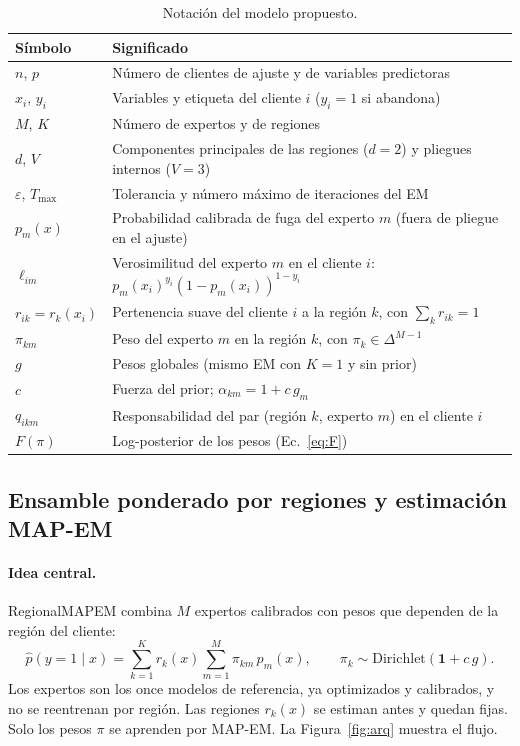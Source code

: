 \documentclass[11pt,a4paper]{article}
\begin{document}
\begin{table}[t]
\centering
\caption{Notación del modelo propuesto.}
\label{tab:notacion}
\small
\begin{tabular}{ll}
\toprule
Símbolo & Significado \\
\midrule
$n$, $p$ & Número de clientes de ajuste y de variables predictoras \\
$x_i$, $y_i$ & Variables y etiqueta del cliente $i$ ($y_i=1$ si abandona) \\
$M$, $K$ & Número de expertos y de regiones \\
$d$, $V$ & Componentes principales de las regiones ($d=2$) y pliegues internos ($V=3$) \\
$\varepsilon$, $T_{\max}$ & Tolerancia y número máximo de iteraciones del EM \\
$p_m(x)$ & Probabilidad calibrada de fuga del experto $m$ (fuera de pliegue en el ajuste) \\
$\ell_{im}$ & Verosimilitud del experto $m$ en el cliente $i$: $p_m(x_i)^{y_i}(1-p_m(x_i))^{1-y_i}$ \\
$r_{ik}=r_k(x_i)$ & Pertenencia suave del cliente $i$ a la región $k$, con $\sum_k r_{ik}=1$ \\
$\pi_{km}$ & Peso del experto $m$ en la región $k$, con $\pi_k\in\Delta^{M-1}$ \\
$g$ & Pesos globales (mismo EM con $K=1$ y sin prior) \\
$c$ & Fuerza del prior; $\alpha_{km}=1+c\,g_m$ \\
$q_{ikm}$ & Responsabilidad del par (región $k$, experto $m$) en el cliente $i$ \\
$F(\pi)$ & Log-posterior de los pesos (Ec.~\ref{eq:F}) \\
\bottomrule
\end{tabular}
\end{table}

\subsection{Ensamble ponderado por regiones y estimación MAP-EM}

\paragraph{Idea central.} RegionalMAPEM combina $M$ expertos calibrados con pesos que dependen de la región del cliente:
\begin{equation}
\hat p(y=1\mid x)=\sum_{k=1}^{K} r_k(x)\sum_{m=1}^{M}\pi_{km}\,p_m(x),\qquad \pi_k\sim\mathrm{Dirichlet}(\mathbf 1+c\,g).
\label{eq:model}
\end{equation}
Los expertos son los once modelos de referencia, ya optimizados y calibrados, y no se reentrenan por región. Las regiones $r_k(x)$ se estiman antes y quedan fijas. Solo los pesos $\pi$ se aprenden por MAP-EM. La Figura~\ref{fig:arq} muestra el flujo.
\end{document}
